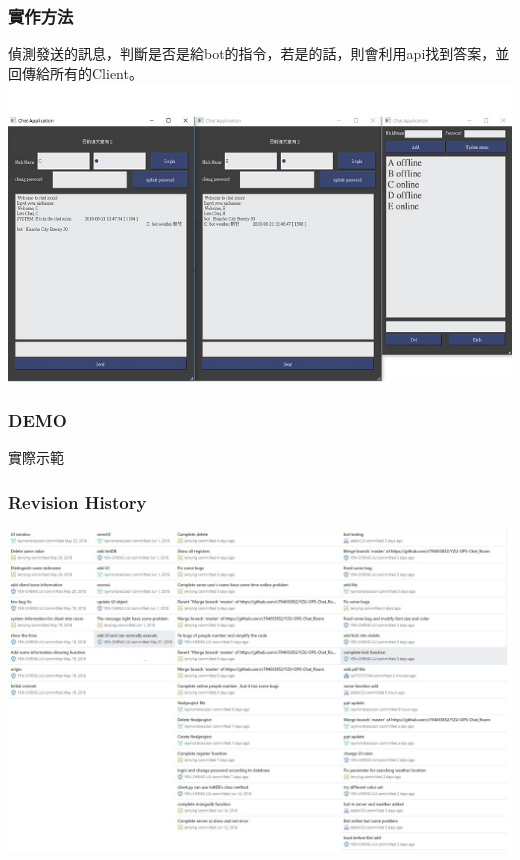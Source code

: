 \documentclass[utf8x]{beamer}
\begin{document}
\begin{frame}[t]
\vspace{1.5em}
\frametitle{\LARGE 實作方法} %
\hspace{2em} \Large 偵測發送的訊息，判斷是否是給bot的指令，若是的話，則會利用api找到答案，並回傳給所有的Client。
\vspace{6em}
\hspace{4em} \includegraphics[scale=0.4]{figure1}
\end{frame}


\begin{frame}
\frametitle{\LARGE DEMO} %
\centerline{\LARGE 實際示範}
\end{frame}
\begin{frame}[t]
\frametitle{\huge Revision History} %
\includegraphics[scale=0.3]{history}
\end{frame}
\end{document}
